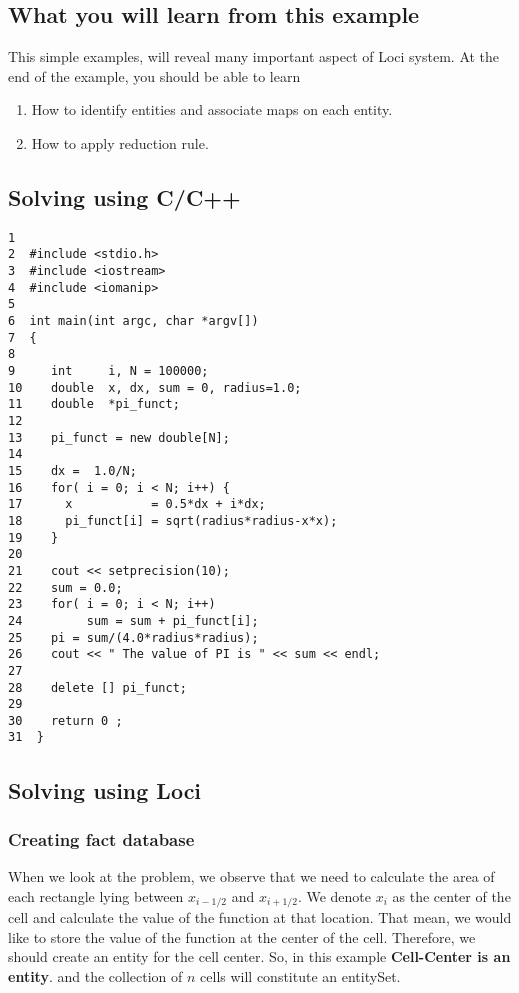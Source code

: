 \subsection { What you will learn from this example }
\par This simple examples, will reveal many important aspect of Loci system. 
At the end of the example, you should be able to learn 
\begin{enumerate}
\item  How to identify entities and associate maps on each entity.
\item  How to apply reduction rule.
\end{enumerate}
%
\subsection { Solving using C/C++ }
\begin{verbatim}
1
2  #include <stdio.h>
3  #include <iostream>
4  #include <iomanip>
5
6  int main(int argc, char *argv[])
7  {
8
9     int     i, N = 100000;
10    double  x, dx, sum = 0, radius=1.0;
11    double  *pi_funct;
12
13    pi_funct = new double[N];
14
15    dx =  1.0/N;
16    for( i = 0; i < N; i++) {
17      x           = 0.5*dx + i*dx;
18      pi_funct[i] = sqrt(radius*radius-x*x);
19    }
20
21    cout << setprecision(10);
22    sum = 0.0;
23    for( i = 0; i < N; i++)
24         sum = sum + pi_funct[i];
25    pi = sum/(4.0*radius*radius);
26    cout << " The value of PI is " << sum << endl;
27
28    delete [] pi_funct;
29
30    return 0 ;
31  }
\end{verbatim}

\subsection { Solving using Loci }
\subsubsection { Creating fact database }
%
When we look at the problem, we observe that we need to calculate the
area of each rectangle lying between $x_{i-1/2}$ and $x_{i+1/2}$. We
denote $x_i$ as the center of the cell and calculate the value of the
function at that location. That mean, we would like to store the
value of the function at the center of the cell. Therefore, we should
create an entity for the cell center. So, in this example {\bf Cell-Center
is an entity}. and the collection of $n$ cells will constitute an
entitySet.

